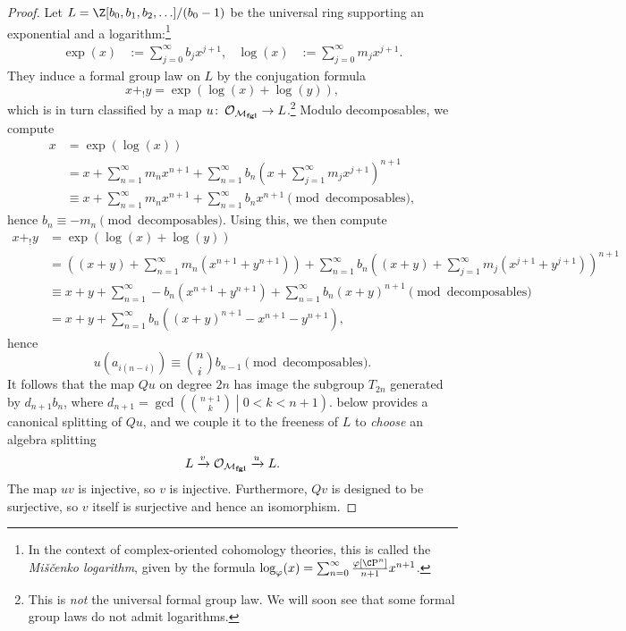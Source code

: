 \begin{proof}
Let $L = \Z[b_0, b_1, b_2, \ldots] / (b_0 - 1)$ be the universal ring supporting an exponential and a logarithm:\footnote{In the context of complex-oriented cohomology theories, this is called the \textit{Mi\v{s}\v{c}enko logarithm}, given by the formula $\log_\phi(x) = \sum_{n=0}^\infty \frac{\phi[\CP^n]}{n+1} x^{n+1}$.}
\begin{align*}
\exp(x) & := \sum_{j=0}^\infty b_j x^{j+1}, &
\log(x) & := \sum_{j=0}^\infty m_j x^{j+1}.
\end{align*}
They induce a formal group law on $L$ by the conjugation formula \[x +_! y = \exp(\log(x) + \log(y)),\] which is in turn classified by a map $u\colon\thinspace \mathcal{O}_{\mathcal{M}_{\mathbf{fgl}}} \to L$.\footnote{This is \emph{not} the universal formal group law.  We will soon see that some formal group laws do not admit logarithms.}  Modulo decomposables, we compute
\begin{align*}
x & = \exp(\log(x)) \\
& = x + \sum_{n=1}^\infty m_n x^{n+1} + \sum_{n=1}^\infty b_n \left( x + \sum_{j=1}^\infty m_j x^{j+1} \right)^{n+1} \\
& \equiv x + \sum_{n=1}^\infty m_n x^{n+1} + \sum_{n=1}^\infty b_n x^{n+1} \pmod{\text{decomposables}},
\end{align*}
hence $b_n \equiv -m_n \pmod{\text{decomposables}}$.  Using this, we then compute
\begin{align*}
x +_! y & = \exp(\log(x) + \log(y)) \\
& = \left( (x + y) + \sum_{n=1}^\infty m_n (x^{n+1} + y^{n+1}) \right) + \sum_{n=1}^\infty b_n \left( (x + y) + \sum_{j=1}^\infty m_j (x^{j+1} + y^{j+1}) \right)^{n+1} \\
& \equiv x + y + \sum_{n=1}^\infty -b_n (x^{n+1} + y^{n+1}) + \sum_{n=1}^\infty b_n (x+y)^{n+1} \pmod{\text{decomposables}} \\
& = x + y + \sum_{n=1}^\infty b_n ((x+y)^{n+1} - x^{n+1} - y^{n+1}),
\end{align*}
hence \[u(a_{i(n-i)}) \equiv \binom{n}{i} b_{n-1} \pmod{\text{decomposables}}.\]  It follows that the map $Qu$ on degree $2n$ has image the subgroup $T_{2n}$ generated by $d_{n+1} b_n$, where $d_{n+1} = \gcd\left( \binom{n+1}{k} \middle| 0 < k < n + 1 \right)$.   below provides a canonical splitting of $Qu$, and we couple it to the freeness of $L$ to \emph{choose} an algebra splitting \[L \xrightarrow{v} \mathcal{O}_{\mathcal{M}_{\mathbf{fgl}}} \xrightarrow{u} L.\]  The map $uv$ is injective, so $v$ is injective.  Furthermore, $Qv$ is designed to be surjective, so $v$ itself is surjective and hence an isomorphism.
\end{proof}

